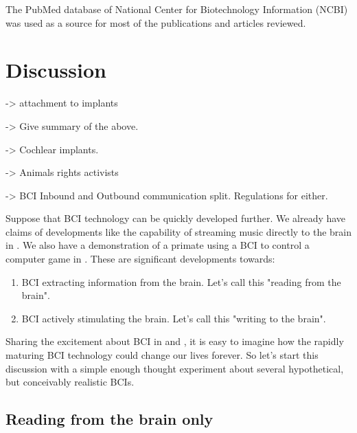 \documentclass[fleqn,11pt]{olplainarticle}
\begin{document}
The PubMed database of  National Center for Biotechnology Information (NCBI) was used as a source for most of the publications and articles reviewed.

\section{Discussion}
-> attachment to implants \cite{warwick2003cyborg}

-> Give summary of the above.

-> Cochlear implants.

-> Animals rights activists

-> BCI Inbound and Outbound communication split. Regulations for either.

Suppose that BCI technology can be quickly developed further. We already have claims of developments like the capability of streaming music directly to the brain in \cite{pero_2020}. We also have a demonstration of a primate using a BCI to control a computer game in \cite{wakefield_2020}. These are significant developments towards:
\begin{enumerate}
    \item BCI extracting information from the brain. Let's call this "reading from the brain".
    \item BCI actively stimulating the brain. Let's call this "writing to the brain".
\end{enumerate}

Sharing the excitement about BCI in \cite{warwick2003cyborg} and \cite{schalk2008brain}, it is easy to imagine how the rapidly maturing BCI technology could change our lives forever. So let's start this discussion with a simple enough thought experiment about several hypothetical, but conceivably realistic BCIs.

\subsection{Reading from the brain only}
\end{document}
